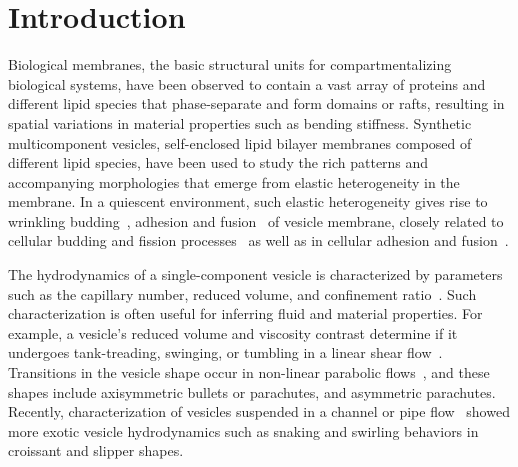 \documentclass[twoside,twocolumn,9pt]{article}
\begin{document}

\section{\label{sec:Introduction}Introduction}
Biological membranes, the basic structural units for compartmentalizing
biological systems, have been observed to contain a vast array of
proteins and different lipid species that phase-separate and form
domains or rafts, resulting in spatial variations in material properties
such as bending stiffness. Synthetic multicomponent vesicles,
self-enclosed lipid bilayer membranes composed of different lipid
species, have been used to study the rich patterns and accompanying
morphologies that emerge from elastic heterogeneity in the membrane. In
a quiescent environment, such elastic heterogeneity gives rise to
wrinkling budding~\cite{Lowengrub2009_PRE, Li2012_CommMathSci}, adhesion
and fusion~\cite{Zhao2011_PRE} of vesicle membrane, closely related to
cellular budding and fission processes~\cite{Rauch2000_BiophysJ} as well
as in cellular adhesion and fusion~\cite{Takeda2003_PNAS}. 

The hydrodynamics of a single-component vesicle is characterized by
parameters such as the capillary number, reduced volume, and confinement
ratio~\cite{Abreu2014_ACI}. Such characterization is often useful for
inferring fluid and material properties.
For example, a vesicle's reduced volume and viscosity contrast determine
if it undergoes tank-treading, swinging, or tumbling in a linear shear
flow~\cite{nog-gom2005}. Transitions in the vesicle shape occur in
non-linear parabolic flows~\cite{kao-bir-mis2009, dan-vla-mis2009}, and
these shapes include axisymmetric bullets or parachutes, and asymmetric
parachutes. Recently, characterization of vesicles suspended in a
channel or pipe flow~\cite{lyu-che-far-jae-mis-leo2023, aga-bir2020,
qua-gan-you2021, abb-far-nai-ezz-ben-mis2022,
wan-ii-sug-nod-jin-liu-che-gon2023} showed more exotic vesicle
hydrodynamics such as snaking and swirling behaviors in croissant and
slipper shapes.
\end{document}
